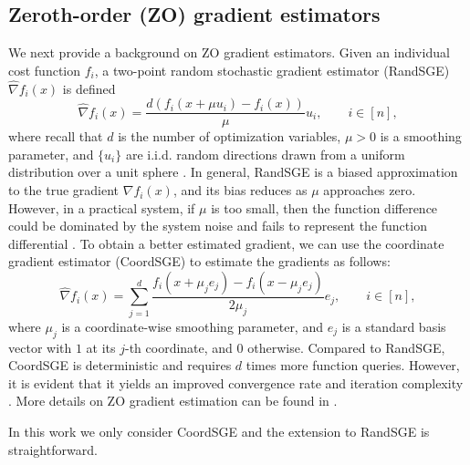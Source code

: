 \documentclass{article}
\theoremstyle{definition}
\theoremstyle{remark}
\begin{document}
\subsection{Zeroth-order (ZO) gradient estimators}

{\color{Brown}
We
next provide a background on ZO gradient estimators.
Given an individual cost function $f_i$, a two-point random stochastic gradient estimator (RandSGE) $\hat{\nabla} f_i(x)$ is defined \cite{nesterov2017random,gao2018information}
\begin{equation}\label{gradestrand}
\hat{\nabla} f_i(x) = \frac{d(f_i(x+\mu u_i) - f_i(x))}{\mu}u_i,\qquad i\in [n],
\end{equation}
where recall that $d$ is the number of optimization variables, $\mu > 0$ is a smoothing parameter, and
$\{u_i\}$ are i.i.d. random directions drawn from a uniform distribution over a unit sphere \cite{flaxman2005online,shamir2017optimal,gao2018information}. In general, RandSGE is a biased approximation to the true gradient $\nabla f_i(x)$, and its bias reduces as $\mu$ approaches zero. However, in a practical system, if $\mu$ is too small, then the function difference
could be dominated by the system noise and fails to represent the function differential \cite{lian2016comprehensive}.}
{\color{Green}
To obtain a better estimated gradient, we
can use the coordinate gradient estimator
(CoordSGE) \cite{gu2018inexact,gu2018faster,liu2018zeroth} to estimate the gradients as follows:
\begin{equation}\label{gradestcoord}
\hat{\nabla} f_i(x) = \sum_{j=1}^d \frac{f_i(x+\mu_je_j) - f_i(x-\mu_je_j)}{2\mu_j}e_j,\qquad i\in [n],
\end{equation}
where $\mu_j$ is a coordinate-wise smoothing parameter, and $e_j$ is a standard basis vector with $1$ at its $j$-th coordinate,
and $0$ otherwise. 
}
{\color{Brown}
Compared to RandSGE, CoordSGE is deterministic and requires $d$ times more function queries. 
However, it is evident that it yields an improved  convergence rate and iteration complexity \cite{liu2018zeroth}. More details on ZO gradient estimation can be found in \cite{kazemi2018proximal}.
}
 

{\color{red} In this work we only consider CoordSGE and the extension to RandSGE is straightforward.}
\end{document}
